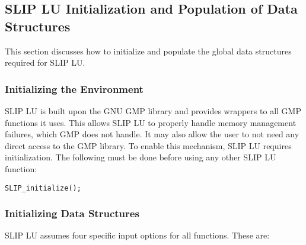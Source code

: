 \documentclass[12pt]{article}
\theoremstyle{definition}
\begin{document}
\cprotect\subsection{SLIP LU Initialization and Population of Data Structures}
\label{s:Using:init}

This section discusses how to initialize and populate the global data
structures required for SLIP LU.

\subsubsection{Initializing the Environment}

SLIP LU is built upon the GNU GMP library \cite{granlund2015gnu} and provides
wrappers to all GMP functions it uses.  This allows SLIP LU to properly handle
memory management failures, which GMP does not handle.  It may also allow the
user to not need any direct access to the GMP library.  To enable this
mechanism, SLIP LU requires initialization.  The following must be done before
using any other SLIP LU function:

\verb|SLIP_initialize();|

\subsubsection{Initializing Data Structures}
\label{ss:init}

SLIP LU assumes four specific input options for all functions. These are:
\end{document}
